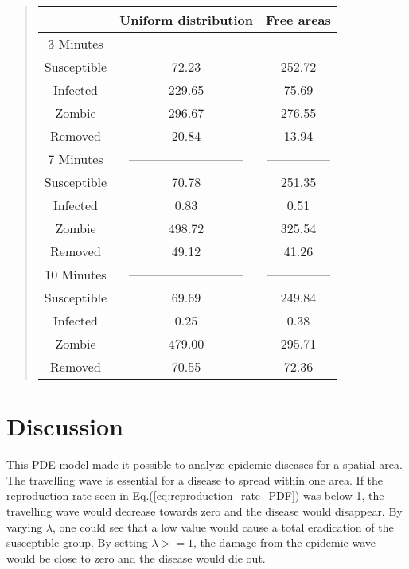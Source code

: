 \documentclass[%
twoside,                 %
final,                   %
chapterprefix=true,      %
open=right               %
10pt]{book}
\begin{document}
\begin{quote}
\begin{tabular}{ccc}
\hline
\multicolumn{1}{c}{  } & \multicolumn{1}{c}{ Uniform distribution } & \multicolumn{1}{c}{ Free areas } \\
\hline
3 Minutes   & --------------------------- & --------------- \\
\hline
Susceptible & 72.23                       & 252.72          \\
Infected    & 229.65                      & 75.69           \\
Zombie      & 296.67                      & 276.55          \\
Removed     & 20.84                       & 13.94           \\
\hline
7 Minutes   & --------------------------- & --------------- \\
\hline
Susceptible & 70.78                       & 251.35          \\
Infected    & 0.83                        & 0.51            \\
Zombie      & 498.72                      & 325.54          \\
Removed     & 49.12                       & 41.26           \\
\hline
10 Minutes  & --------------------------- & --------------- \\
\hline
Susceptible & 69.69                       & 249.84          \\
Infected    & 0.25                        & 0.38            \\
Zombie      & 479.00                      & 295.71          \\
Removed     & 70.55                       & 72.36           \\
\hline
\end{tabular}
\end{quote}

\noindent

\section{Discussion}
\label{section:2_discussion}
This PDE model made it possible to analyze epidemic diseases for a spatial area. The travelling wave is essential for a disease to spread within one area. If the reproduction rate seen in Eq.(\ref{eq:reproduction_rate_PDF}) was below 1, the travelling wave would decrease towards zero and the disease would disappear. By varying $\lambda$, one could see that a low value would cause a total eradication of the susceptible group. By setting $\lambda>=1$, the damage from the epidemic wave would be close to zero and the disease would die out.
\end{document}
